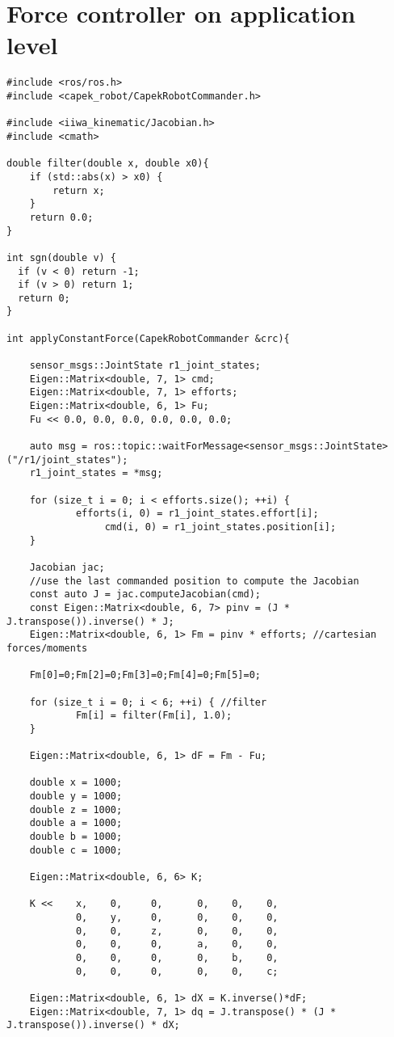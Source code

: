 \chapter{Force controller on application level}

\begin{lstlisting}
#include <ros/ros.h>
#include <capek_robot/CapekRobotCommander.h>

#include <iiwa_kinematic/Jacobian.h>
#include <cmath>

double filter(double x, double x0){
    if (std::abs(x) > x0) {
        return x;
    }
    return 0.0;
}

int sgn(double v) {
  if (v < 0) return -1;
  if (v > 0) return 1;
  return 0;
}

int applyConstantForce(CapekRobotCommander &crc){
	
	sensor_msgs::JointState r1_joint_states;
	Eigen::Matrix<double, 7, 1> cmd;
	Eigen::Matrix<double, 7, 1> efforts;
	Eigen::Matrix<double, 6, 1> Fu;
	Fu << 0.0, 0.0, 0.0, 0.0, 0.0, 0.0; 

	auto msg = ros::topic::waitForMessage<sensor_msgs::JointState>("/r1/joint_states");
	r1_joint_states = *msg;

	for (size_t i = 0; i < efforts.size(); ++i) {
        	efforts(i, 0) = r1_joint_states.effort[i];
		         cmd(i, 0) = r1_joint_states.position[i];
	}

	Jacobian jac;
	//use the last commanded position to compute the Jacobian
	const auto J = jac.computeJacobian(cmd); 
	const Eigen::Matrix<double, 6, 7> pinv = (J * J.transpose()).inverse() * J;
	Eigen::Matrix<double, 6, 1> Fm = pinv * efforts; //cartesian forces/moments

	Fm[0]=0;Fm[2]=0;Fm[3]=0;Fm[4]=0;Fm[5]=0;

	for (size_t i = 0; i < 6; ++i) { //filter
            Fm[i] = filter(Fm[i], 1.0);
	} 

	Eigen::Matrix<double, 6, 1> dF = Fm - Fu;

	double x = 1000;
	double y = 1000;
	double z = 1000;
	double a = 1000;
	double b = 1000;
	double c = 1000;

	Eigen::Matrix<double, 6, 6> K;

	K <<    x,    0,     0,      0,    0,    0,
        	0,    y,     0,      0,    0,    0,
        	0,    0,     z,      0,    0,    0,
        	0,    0,     0,      a,    0,    0,
        	0,    0,     0,      0,    b,    0,
        	0,    0,     0,      0,    0,    c;

	Eigen::Matrix<double, 6, 1> dX = K.inverse()*dF;
	Eigen::Matrix<double, 7, 1> dq = J.transpose() * (J * J.transpose()).inverse() * dX;


\end{lstlisting}
